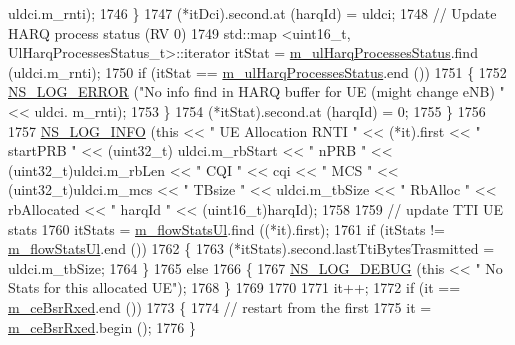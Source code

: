 \begin{DoxyCode}
      uldci.m\_rnti);
1746             \}
1747           (*itDci).second.at (harqId) = uldci;
1748           \textcolor{comment}{// Update HARQ process status (RV 0)}
1749           std::map <uint16\_t, UlHarqProcessesStatus\_t>::iterator itStat = 
      \hyperlink{classns3_1_1FdBetFfMacScheduler_a7abd82b962ddf3b3fb688de9528bc04a}{m\_ulHarqProcessesStatus}.find (uldci.m\_rnti);
1750           \textcolor{keywordflow}{if} (itStat == \hyperlink{classns3_1_1FdBetFfMacScheduler_a7abd82b962ddf3b3fb688de9528bc04a}{m\_ulHarqProcessesStatus}.end ())
1751             \{
1752               \hyperlink{group__logging_ga0261a8db1d4ac5f79417d117634fd455}{NS\_LOG\_ERROR} (\textcolor{stringliteral}{"No info find in HARQ buffer for UE (might change eNB) "} << uldci.
      m\_rnti);
1753             \}
1754           (*itStat).second.at (harqId) = 0;
1755         \}
1756 
1757       \hyperlink{group__logging_gafbd73ee2cf9f26b319f49086d8e860fb}{NS\_LOG\_INFO} (\textcolor{keyword}{this} << \textcolor{stringliteral}{" UE Allocation RNTI "} << (*it).first << \textcolor{stringliteral}{" startPRB "} << (uint32\_t)
      uldci.m\_rbStart << \textcolor{stringliteral}{" nPRB "} << (uint32\_t)uldci.m\_rbLen << \textcolor{stringliteral}{" CQI "} << cqi << \textcolor{stringliteral}{" MCS "} << (uint32\_t)uldci.m\_mcs 
      << \textcolor{stringliteral}{" TBsize "} << uldci.m\_tbSize << \textcolor{stringliteral}{" RbAlloc "} << rbAllocated << \textcolor{stringliteral}{" harqId "} << (uint16\_t)harqId);
1758 
1759       \textcolor{comment}{// update TTI  UE stats}
1760       itStats = \hyperlink{classns3_1_1FdBetFfMacScheduler_ab32cc321792e04b643a0c976d79ba8b6}{m\_flowStatsUl}.find ((*it).first);
1761       \textcolor{keywordflow}{if} (itStats != \hyperlink{classns3_1_1FdBetFfMacScheduler_ab32cc321792e04b643a0c976d79ba8b6}{m\_flowStatsUl}.end ())
1762         \{
1763           (*itStats).second.lastTtiBytesTrasmitted =  uldci.m\_tbSize;
1764         \}
1765       \textcolor{keywordflow}{else}
1766         \{
1767           \hyperlink{group__logging_ga413f1886406d49f59a6a0a89b77b4d0a}{NS\_LOG\_DEBUG} (\textcolor{keyword}{this} << \textcolor{stringliteral}{" No Stats for this allocated UE"});
1768         \}
1769 
1770 
1771       it++;
1772       \textcolor{keywordflow}{if} (it == \hyperlink{classns3_1_1FdBetFfMacScheduler_a86411f2dd593676d88de396ef4d0b6e5}{m\_ceBsrRxed}.end ())
1773         \{
1774           \textcolor{comment}{// restart from the first}
1775           it = \hyperlink{classns3_1_1FdBetFfMacScheduler_a86411f2dd593676d88de396ef4d0b6e5}{m\_ceBsrRxed}.begin ();
1776         \}

\end{DoxyCode}
